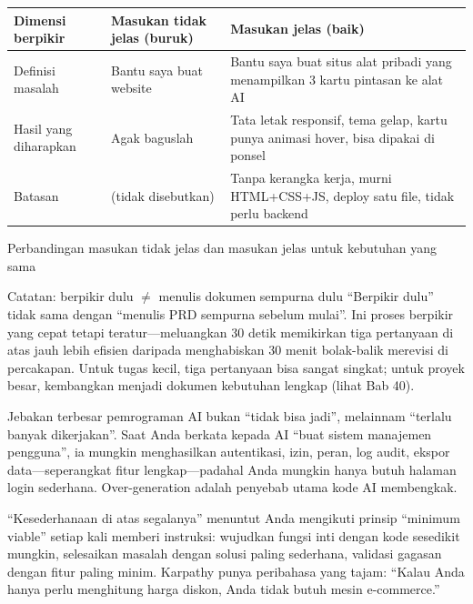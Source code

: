 \begin{center}
\begin{tabularx}{\linewidth}{|X|X|X|}
\hline
\textbf{Dimensi berpikir} & \textbf{Masukan tidak jelas (buruk)} & \textbf{Masukan jelas (baik)} \tabularnewline
\hline
Definisi masalah & Bantu saya buat website & Bantu saya buat situs alat pribadi yang menampilkan 3 kartu pintasan ke alat AI \tabularnewline
Hasil yang diharapkan & Agak baguslah & Tata letak responsif, tema gelap, kartu punya animasi hover, bisa dipakai di ponsel \tabularnewline
Batasan & (tidak disebutkan) & Tanpa kerangka kerja, murni HTML+CSS+JS, deploy satu file, tidak perlu backend \tabularnewline
\hline
\end{tabularx}
\end{center}

\begin{center}\small\color{gray}Perbandingan masukan tidak jelas dan masukan jelas untuk kebutuhan yang sama\end{center}

\begin{tcbwarn}{Catatan: berpikir dulu $\neq$ menulis dokumen sempurna dulu}
“Berpikir dulu” tidak sama dengan “menulis PRD sempurna sebelum mulai”. Ini proses berpikir yang cepat tetapi teratur—meluangkan 30 detik memikirkan tiga pertanyaan di atas jauh lebih efisien daripada menghabiskan 30 menit bolak-balik merevisi di percakapan. Untuk tugas kecil, tiga pertanyaan bisa sangat singkat; untuk proyek besar, kembangkan menjadi dokumen kebutuhan lengkap (lihat Bab 40).

\end{tcbwarn}


Jebakan terbesar pemrograman AI bukan “tidak bisa jadi”, melainnam “terlalu banyak dikerjakan”. Saat Anda berkata kepada AI “buat sistem manajemen pengguna”, ia mungkin menghasilkan autentikasi, izin, peran, log audit, ekspor data—seperangkat fitur lengkap—padahal Anda mungkin hanya butuh halaman login sederhana. Over-generation adalah penyebab utama kode AI membengkak.

“Kesederhanaan di atas segalanya” menuntut Anda mengikuti prinsip “minimum viable” setiap kali memberi instruksi: wujudkan fungsi inti dengan kode sesedikit mungkin, selesaikan masalah dengan solusi paling sederhana, validasi gagasan dengan fitur paling minim. Karpathy punya peribahasa yang tajam: “Kalau Anda hanya perlu menghitung harga diskon, Anda tidak butuh mesin e-commerce.”

